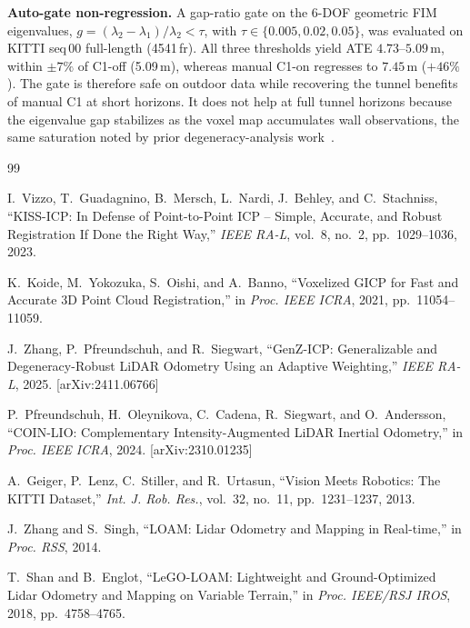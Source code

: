 \documentclass[journal,letterpaper,10pt]{IEEEtran}
\begin{document}
\textbf{Auto-gate non-regression.}
A gap-ratio gate on the 6-DOF geometric FIM eigenvalues,
$g = (\lambda_2{-}\lambda_1)/\lambda_2 < \tau$, with
$\tau\in\{0.005,0.02,0.05\}$, was evaluated on KITTI seq\,00
full-length (4541\,fr). All three thresholds yield ATE
$4.73$--$5.09$\,m, within $\pm7\%$ of C1-off (5.09\,m), whereas
manual C1-on regresses to $7.45$\,m ($+46\%$). The gate is therefore
safe on outdoor data while recovering the tunnel benefits of manual C1
at short horizons. It does not help at full tunnel horizons because
the eigenvalue gap stabilizes as the voxel map accumulates wall
observations, the same saturation noted by prior degeneracy-analysis
work~\cite{zhang2016degeneracy}.


\begin{thebibliography}{99}

I.~Vizzo, T.~Guadagnino, B.~Mersch, L.~Nardi, J.~Behley, and C.~Stachniss,
``KISS-ICP: In Defense of Point-to-Point ICP -- Simple, Accurate, and Robust
Registration If Done the Right Way,''
\textit{IEEE RA-L}, vol.~8, no.~2, pp.~1029--1036, 2023.

K.~Koide, M.~Yokozuka, S.~Oishi, and A.~Banno,
``Voxelized GICP for Fast and Accurate 3D Point Cloud Registration,''
in \textit{Proc. IEEE ICRA}, 2021, pp.~11054--11059.

J.~Zhang, P.~Pfreundschuh, and R.~Siegwart,
``GenZ-ICP: Generalizable and Degeneracy-Robust LiDAR Odometry Using an
Adaptive Weighting,''
\textit{IEEE RA-L}, 2025. [arXiv:2411.06766]

P.~Pfreundschuh, H.~Oleynikova, C.~Cadena, R.~Siegwart, and O.~Andersson,
``COIN-LIO: Complementary Intensity-Augmented LiDAR Inertial Odometry,''
in \textit{Proc. IEEE ICRA}, 2024. [arXiv:2310.01235]

A.~Geiger, P.~Lenz, C.~Stiller, and R.~Urtasun,
``Vision Meets Robotics: The KITTI Dataset,''
\textit{Int. J. Rob. Res.}, vol.~32, no.~11, pp.~1231--1237, 2013.

J.~Zhang and S.~Singh,
``LOAM: Lidar Odometry and Mapping in Real-time,''
in \textit{Proc. RSS}, 2014.

T.~Shan and B.~Englot,
``LeGO-LOAM: Lightweight and Ground-Optimized Lidar Odometry and Mapping
on Variable Terrain,''
in \textit{Proc. IEEE/RSJ IROS}, 2018, pp.~4758--4765.


\end{thebibliography}
\end{document}
